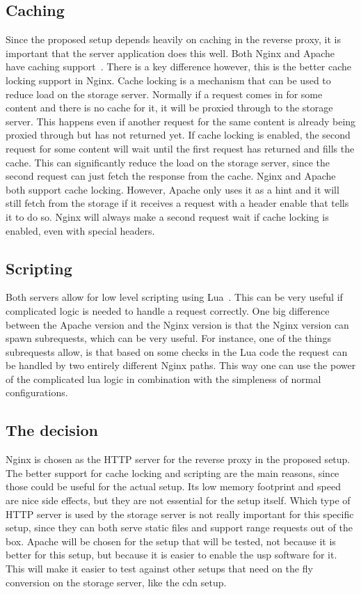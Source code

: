 \documentclass[twoside,openright]{uva-bachelor-thesis}
\begin{document}
\subsection{Caching}
Since the proposed setup depends heavily on caching in the reverse proxy, it is
important that the server application does this well. Both Nginx and Apache have
caching support~\hbox{\autocites{nginxcache}{apachecache}}. There is a key
difference however, this is the better cache locking support in Nginx. Cache
locking is a mechanism that can be used to reduce load on the storage server.
Normally if a request comes in for some content and there is no cache for it,
it will be proxied through to the storage server. This happens even if another
request for the same content is already being proxied through but has not
returned yet. If cache locking is enabled, the second request for some content
will wait until the first request has returned and fills the cache. This can
significantly reduce the load on the storage server, since the second request
can just fetch the response from the cache. Nginx and Apache both support cache
locking. However, Apache only uses it as a hint and it will still fetch from the
storage if it receives a request with a header enable that tells it to do so.
Nginx will always make a second request wait if cache locking is enabled, even
with special headers.


\subsection{Scripting}
Both servers allow for low level scripting using
Lua~\autocites{nginxlua}{cloudflarelua}{apachelua}. This can be very useful if
complicated logic is needed to handle a request correctly. One big difference
between the Apache version and the Nginx version is that the Nginx version
can spawn subrequests, which can be very useful. For instance, one of the things
subrequests allow, is that based on some checks in the Lua code the request can
be handled by two entirely different Nginx paths. This way one can use the power
of the complicated lua logic in combination with the simpleness of normal
configurations.


\subsection{The decision}
Nginx is chosen as the HTTP server for the reverse proxy in the proposed setup.
The better support for cache locking and scripting are the main reasons, since
those could be useful for the actual setup. Its low memory footprint and speed
are nice side effects, but they are not essential for the setup itself.  Which
type of HTTP server is used by the storage server is not really important for
this specific setup, since they can both serve static files and support
range requests out of the box. Apache will be chosen for the setup that will be
tested, not because it is better for this setup, but because it is easier to
enable the \gls{usp} software for it. This will make it easier to test against
other setups that need on the fly conversion on the storage server, like the
\gls{cdn} setup.
\end{document}
